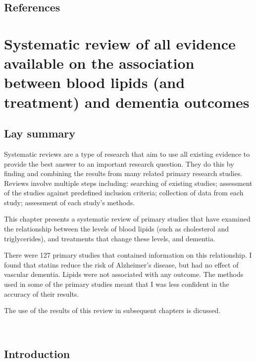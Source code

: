 \documentclass[a4paper, twoside]{templates/ociamthesis}
\begin{document}
\newpage

\hypertarget{references-1}{%
\section{References}\label{references-1}}



\hypertarget{sys-rev-heading}{%
\chapter{Systematic review of all evidence available on the association between blood lipids (and treatment) and dementia outcomes}\label{sys-rev-heading}}

\minitoc 

\hypertarget{lay-summary-2}{%
\section{Lay summary}\label{lay-summary-2}}

Systematic reviews are a type of research that aim to use all existing evidence to provide the best answer to an important research question. They do this by finding and combining the results from many related primary research studies. Reviews involve multiple steps including: searching of existing studies; assessment of the studies against predefined inclusion criteria; collection of data from each study; assessment of each study's methods.

This chapter presents a systematic review of primary studies that have examined the relationship between the levels of blood lipids (such as cholesterol and triglycerides), and treatments that change these levels, and dementia.

There were 127 primary studies that contained information on this relationship. I found that statins reduce the risk of Alzheimer's disease, but had no effect of vascular dementia. Lipids were not associated with any outcome. The methods used in some of the primary studies meant that I was less confident in the accuracy of their results.

The use of the results of this review in subsequent chapters is dicussed.

~

\hypertarget{sys-rev-intro}{%
\section{Introduction}\label{sys-rev-intro}}
\end{document}
